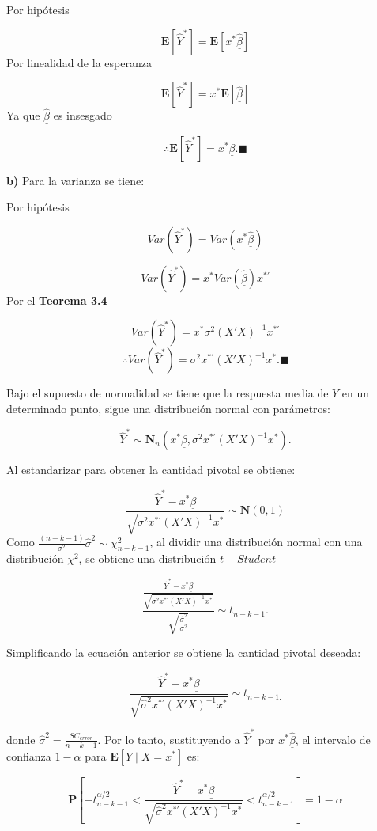 \documentclass[a4paper,oneside,openany]{book}
\begin{document}
Por hipótesis

\[\mathbf{E}[\hat{Y}^*]=\mathbf{E}[x^*\underline{\hat{\beta}}]\] Por
linealidad de la esperanza

\[\mathbf{E}[\hat{Y}^*]=x^*\mathbf{E}[\underline{\hat{\beta}}]\] Ya que
\(\underline{\hat{\beta}}\) es insesgado

\[\therefore \mathbf{E}[\hat{Y}^*]= x^*\underline{\beta}.\blacksquare\]

\textbf{b)} Para la varianza se tiene:

Por hipótesis

\[Var(\hat{Y}^*)=Var(x^*\underline{\hat{\beta}})\]

\[Var(\hat{Y}^*)=x^*Var(\underline{\hat{\beta}})x^{*'}\] Por el
\textbf{Teorema 3.4}

\[Var(\hat{Y}^*)=x^*\sigma^2(X'X)^{-1}x^{*'}\]
\[\therefore Var(\hat{Y}^*)=\sigma^2 x^{*'}(X'X)^{-1}x^*.\blacksquare\]

Bajo el supuesto de normalidad se tiene que la respuesta media de \(Y\)
en un determinado punto, sigue una distribución normal con parámetros:

\[\hat{Y}^* \sim \mathbf{N}_{n}\left(x^*\underline{\beta} ,\sigma^2 x^{*'}(X'X)^{-1}x^*\right).\]

Al estandarizar para obtener la cantidad pivotal se obtiene:

\[\frac{\hat{Y}^*-x^*\underline{\beta}}{\sqrt{\sigma^2 x^{*'}(X'X)^{-1}x^*}}\sim \mathbf{N}(0,1)\]
Como \(\frac{(n-k-1)}{\sigma^2}\hat{\sigma}^2 \sim \chi^2_{n-k-1}\), al
dividir una distribución normal con una distribución \(\chi^2\), se
obtiene una distribución \(t-Student\)

\[\frac{\frac{\hat{Y}^*-x^*\underline{\beta}}{\sqrt{\sigma^2 x^{*'}(X'X)^{-1}x^*}}}{\sqrt{\frac{\hat{\sigma}^2}{\sigma^2}}} \sim t_{n-k-1}.\]

Simplificando la ecuación anterior se obtiene la cantidad pivotal
deseada:

\[\frac{\hat{Y}^*-x^*\underline{\beta}}{\sqrt{\hat{\sigma}^2 x^{*'}(X'X)^{-1}x^*}}\sim t_{n-k-1.}\]

donde \(\hat{\sigma}^2=\frac{SC_{error}}{n-k-1}.\) Por lo tanto,
sustituyendo a \(\hat{Y}^*\) por \(x^*\underline{\hat{\beta}}\), el
intervalo de confianza \(1-\alpha\) para \(\mathbf{E}[Y \mid X=x^*]\)
es:

\[\mathbf{P}\left[ -t^{\alpha/2}_{n-k-1}<\frac{\hat{Y}^*-x^*\underline{\beta}}{\sqrt{\hat{\sigma}^2 x^{*'}(X'X)^{-1}x^*}}  <t^{\alpha/2}_{n-k-1}\right]=1-\alpha\]
\end{document}
